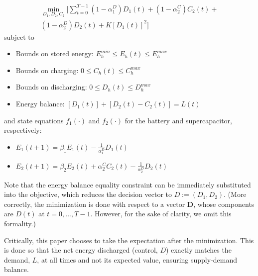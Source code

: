 \documentclass[conference]{IEEEtran}
\begin{document}
\begin{multline} \label{eq:initCostFnc}
    \min_{D_{1},D_{2},C_{2}}\Biggl[\sum_{t=0}^{T-1}
	(1-\alpha_{1}^{D})D_{1}(t)+
	(1-\alpha_{2}^{C})C_{2}(t)+\\
	(1-\alpha_{2}^{D})D_{2}(t)+
	K\left[D_{1}(t)\right]^{2}
	\Biggr]\end{multline}
subject to
\begin{itemize}
    \item Bounds on stored energy: 
	\begin{math}E_{h}^{min}\leq E_{h}(t)\leq E_{h}^{max}\end{math}
	\item Bounds on charging:
	\begin{math}0\leq C_{h}(t)\leq C_{h}^{max}\end{math}
	\item Bounds on discharging:
	\begin{math}0\leq D_{h}(t)\leq D_{h}^{max}\end{math}
	\item Energy balance:
	\begin{math}\left[D_{1}(t)\right] + \left[D_{2}(t) - C_{2}(t)\right] = L(t)\end{math}
\end{itemize}
and state equations $f_{1}(\cdot)$ and $f_{2}(\cdot)$ for the battery and supercapacitor, respectively:
\begin{itemize}
    \item \begin{math}E_{1}(t+1)=\beta_{1}E_{1}(t)-\frac{1}{\alpha_{1}^{D}}D_{1}(t)\end{math}
    \item \begin{math}E_{2}(t+1)=\beta_{2}E_{2}(t)+\alpha_{2}^{C}C_{2}(t)-\frac{1}{\alpha_{2}^{D}}D_{2}(t)\end{math}\newline
\end{itemize} Note that the energy balance equality constraint can be immediately substituted into the objective, which reduces the decision vector to $D:=(D_{1},D_{2})$. (More correctly, the minimization is done with respect to a vector $\textbf{D}$, whose components are $D(t)$ at $t=0,...,T-1$.  However, for the sake of clarity, we omit this formality.)

Critically, this paper chooses to take the expectation after the minimization. This is done so that the net energy discharged (control, $D$) exactly matches the demand, $L$, at all times and not its expected value, ensuring supply-demand balance.
\end{document}
